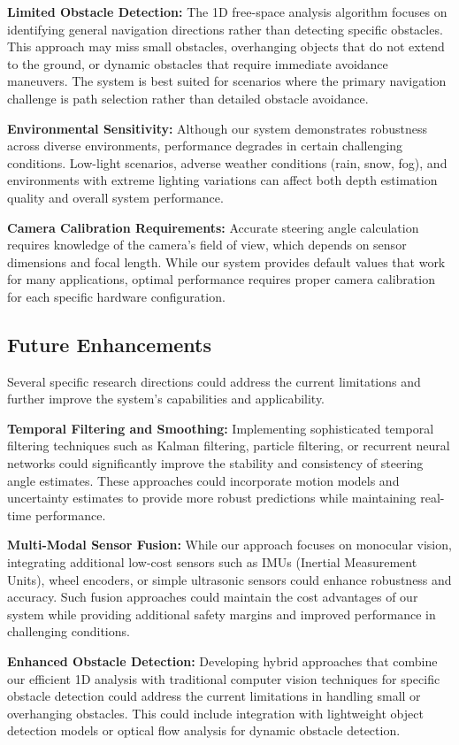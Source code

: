 \documentclass[conference]{IEEEtran}
\begin{document}
\textbf{Limited Obstacle Detection:} The 1D free-space analysis algorithm focuses on identifying general navigation directions rather than detecting specific obstacles. This approach may miss small obstacles, overhanging objects that do not extend to the ground, or dynamic obstacles that require immediate avoidance maneuvers. The system is best suited for scenarios where the primary navigation challenge is path selection rather than detailed obstacle avoidance.

\textbf{Environmental Sensitivity:} Although our system demonstrates robustness across diverse environments, performance degrades in certain challenging conditions. Low-light scenarios, adverse weather conditions (rain, snow, fog), and environments with extreme lighting variations can affect both depth estimation quality and overall system performance.

\textbf{Camera Calibration Requirements:} Accurate steering angle calculation requires knowledge of the camera's field of view, which depends on sensor dimensions and focal length. While our system provides default values that work for many applications, optimal performance requires proper camera calibration for each specific hardware configuration.

\subsection{Future Enhancements}
Several specific research directions could address the current limitations and further improve the system's capabilities and applicability.

\textbf{Temporal Filtering and Smoothing:} Implementing sophisticated temporal filtering techniques such as Kalman filtering, particle filtering, or recurrent neural networks could significantly improve the stability and consistency of steering angle estimates. These approaches could incorporate motion models and uncertainty estimates to provide more robust predictions while maintaining real-time performance.

\textbf{Multi-Modal Sensor Fusion:} While our approach focuses on monocular vision, integrating additional low-cost sensors such as IMUs (Inertial Measurement Units), wheel encoders, or simple ultrasonic sensors could enhance robustness and accuracy. Such fusion approaches could maintain the cost advantages of our system while providing additional safety margins and improved performance in challenging conditions.

\textbf{Enhanced Obstacle Detection:} Developing hybrid approaches that combine our efficient 1D analysis with traditional computer vision techniques for specific obstacle detection could address the current limitations in handling small or overhanging obstacles. This could include integration with lightweight object detection models or optical flow analysis for dynamic obstacle detection.
\end{document}
